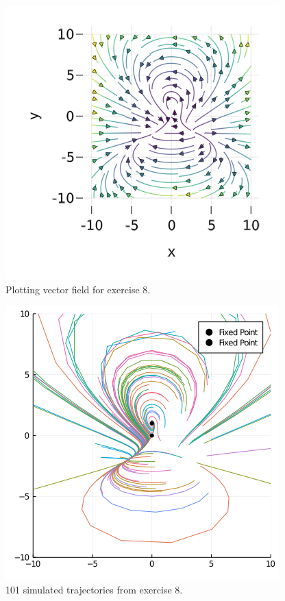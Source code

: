 \documentclass[12pt]{article}
\theoremstyle{definition}
\theoremstyle{remark}
\begin{document}
   \begin{figure}[h]
     \centering
     \includegraphics[width=0.8\linewidth]{figs/hw-1-exer-8.png}
     \caption{Plotting vector field for exercise 8.}%
     \label{fig:exer-8}
 \end{figure}

   \begin{figure}[h]
     \centering
     \includegraphics[width=0.8\linewidth]{figs/hw-1-exer-8-traj.png}
     \caption{101 simulated trajectories from exercise 8.}%
     \label{fig:exer-8-traj}
 \end{figure}
\end{document}
